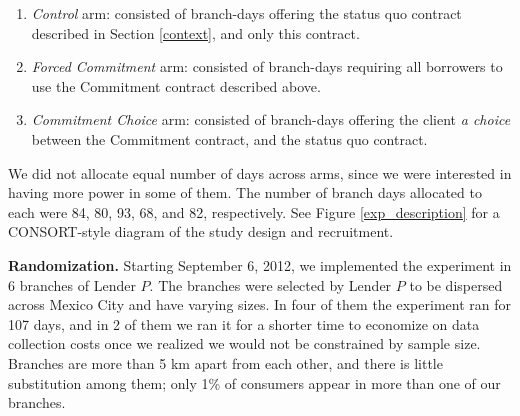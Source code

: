\documentclass[oneside,11pt]{article}
\begin{document}
\begin{enumerate}
    \item \textit{Control} arm: consisted of branch-days offering the status quo contract described in Section \ref{context}, and only this contract. 
    \item \textit{Forced Commitment} arm: consisted of branch-days requiring all borrowers to use the Commitment contract described above.  
    \item \textit{Commitment Choice} arm: consisted of branch-days offering the client \textit{a choice} between the Commitment contract, and the status quo contract.
\end{enumerate}

We did not allocate equal number of days across arms, since we were interested in having more power in some of them. The number of branch days allocated to each were 84, 80, 93, 68, and 82, respectively.  See Figure \ref{exp_description} for a CONSORT-style diagram of the study design and recruitment.


\vspace{.2in}
\noindent \textbf{Randomization.}  Starting September 6, 2012, we implemented the experiment in 6 branches of Lender $P$. The branches were selected by Lender $P$ to be dispersed across Mexico City and have varying sizes. In four of them the experiment ran for 107 days, and in 2 of them we ran it for a shorter time to economize on data collection costs once we realized we would not be constrained by sample size. %
Branches are more than 5 km apart from each other, and there is little substitution among them; only 1\% of consumers appear in more than one of our branches.
\end{document}
